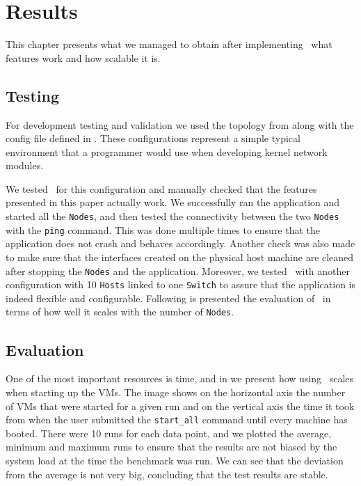 \chapter{Results}
\label{chapter:Chapter 5}

This chapter presents what we managed to obtain after implementing \project\, what features work and how scalable it is.

\section{Testing}
\label{sec:testing}

For development testing and validation we used the topology from  along with the config file defined in .
These configurations represent a simple typical environment that a programmer would use when developing kernel network modules.

We tested \project\ for this configuration and manually checked that the features presented in this paper actually work.
We successfully ran the application and started all the \texttt{Nodes}, and then tested the connectivity between the two \texttt{Nodes} with the \texttt{ping} command.
This was done multiple times to ensure that the application does not crash and behaves accordingly.
Another check was also made to make sure that the interfaces created on the physical host machine are cleaned after stopping the \texttt{Nodes} and the application.
Moreover, we tested \project\ with another configuration with 10 \texttt{Hosts} linked to one \texttt{Switch} to assure that the application is indeed flexible and configurable.
Following is presented the evaluation of \project\ in terms of how well it scales with the number of \texttt{Nodes}.

\section{Evaluation}
\label{sec:evaluation}

One of the most important resources is time, and in  we present how using \project\ scales when starting up the VMs.
The image shows on the horizontal axis the number of VMs that were started for a given run and on the vertical axis the time it took from when the user submitted the \texttt{start_all} command until every machine has booted.
There were 10 runs for each data point, and we plotted the average, minimum and maximum runs to ensure that the results are not biased by the system load at the time the benchmark was run.
We can see that the deviation from the average is not very big, concluding that the test results are stable.

